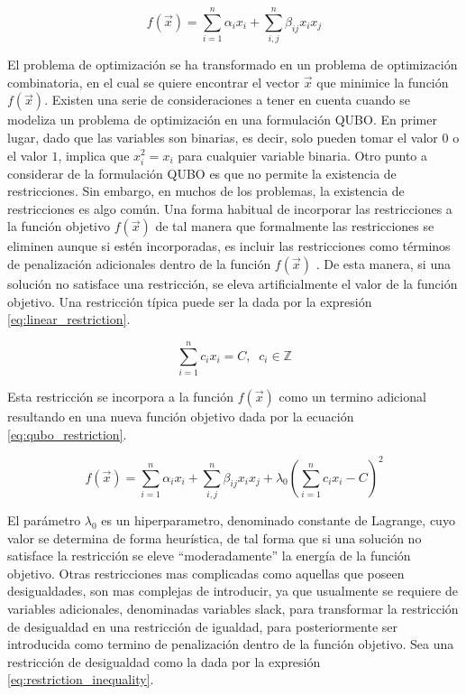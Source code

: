 \begin{equation}
    f(\Vec{x}) = \sum_{i=1}^{n} \alpha_{i} x_{i} + \sum_{i,j}^{n} \beta_{ij} x_{i} x_{j}
    \label{eq:qubo}
\end{equation}


El problema de optimización se ha transformado en un problema de optimización combinatoria, en el cual se quiere encontrar el vector $\Vec{x}$ que minimice la función $f(\Vec{x})$. Existen una serie de consideraciones a tener en cuenta cuando se modeliza un problema de optimización en una formulación \mbox{QUBO}. En primer lugar, dado que las variables son binarias, es decir, solo pueden tomar el valor $0$ o el valor $1$, implica que $x_{i}^{2} = x_{i}$ para cualquier variable binaria. Otro punto a considerar de la formulación \mbox{QUBO} es que no permite la existencia de restricciones. Sin embargo, en muchos de los problemas, la existencia de restricciones es algo común. Una forma habitual de incorporar las restricciones a la función objetivo $f(\Vec{x})$ de tal manera que formalmente las restricciones se eliminen aunque si estén incorporadas, es incluir las restricciones como términos de penalización adicionales dentro de la función $f(\Vec{x})$ \citep{glover}. De esta manera, si una solución no satisface una restricción, se eleva artificialmente el valor de la función objetivo. Una restricción típica puede ser la dada por la expresión \ref{eq:linear_restriction}.

\begin{equation}
    \sum_{i=1}^{n}c_ix_i = C, \; \; c_i \in \mathbb{Z} 
    \label{eq:linear_restriction}
\end{equation}


Esta restricción se incorpora a la función $f(\Vec{x})$ como un termino adicional resultando en una nueva función objetivo dada por la ecuación \ref{eq:qubo_restriction}.

\newpage

\begin{equation}
    f(\Vec{x}) = \sum_{i=1}^{n} \alpha_{i} x_{i} + \sum_{i,j}^{n} \beta_{ij} x_{i} x_{j} + \lambda_0(\sum_{i=1}^n c_ix_i-C)^2
    \label{eq:qubo_restriction}
\end{equation}

El parámetro $\lambda_0$ es un hiperparametro, denominado constante de Lagrange, cuyo valor se determina de forma heurística, de tal forma que si una solución no satisface la restricción se eleve ``moderadamente'' la energía de la función objetivo. Otras restricciones mas complicadas como aquellas que poseen desigualdades, son mas complejas de introducir, ya que usualmente se requiere de variables adicionales, denominadas variables slack, para transformar la restricción de desigualdad en una restricción de igualdad, para posteriormente ser introducida como termino de penalización dentro de la función objetivo. Sea una restricción de desigualdad como la dada por la expresión \ref{eq:restriction_inequality}.


